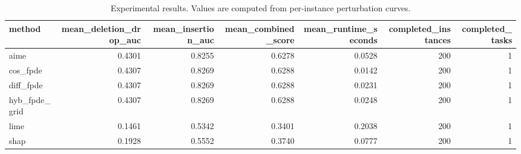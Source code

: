 \begin{table}[t]
\caption{Experimental results. Values are computed from per-instance perturbation curves.}
\label{tab:main_results_computed}
\centering
\begin{tabular}{lrrrrrr}
\toprule
method & mean\_deletion\_drop\_auc & mean\_insertion\_auc & mean\_combined\_score & mean\_runtime\_seconds & completed\_instances & completed\_tasks \\
\midrule
aime & 0.4301 & 0.8255 & 0.6278 & 0.0528 & 200 & 1 \\
cos\_fpde & 0.4307 & 0.8269 & 0.6288 & 0.0142 & 200 & 1 \\
diff\_fpde & 0.4307 & 0.8269 & 0.6288 & 0.0231 & 200 & 1 \\
hyb\_fpde\_grid & 0.4307 & 0.8269 & 0.6288 & 0.0248 & 200 & 1 \\
lime & 0.1461 & 0.5342 & 0.3401 & 0.2038 & 200 & 1 \\
shap & 0.1928 & 0.5552 & 0.3740 & 0.0777 & 200 & 1 \\
\bottomrule
\end{tabular}

\end{table}
